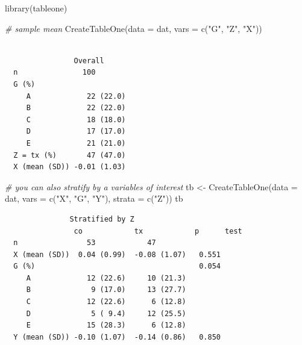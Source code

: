 \documentclass[
  letterpaper,
  DIV=11,
  numbers=noendperiod]{scrreprt}
\newenvironment{Shaded}{}{}
\newcommand{\AttributeTok}[1]{\textcolor[rgb]{0.49,0.56,0.16}{#1}}
\newcommand{\CommentTok}[1]{\textcolor[rgb]{0.38,0.63,0.69}{\textit{#1}}}
\newcommand{\FunctionTok}[1]{\textcolor[rgb]{0.02,0.16,0.49}{#1}}
\newcommand{\NormalTok}[1]{#1}
\newcommand{\OtherTok}[1]{\textcolor[rgb]{0.00,0.44,0.13}{#1}}
\newcommand{\StringTok}[1]{\textcolor[rgb]{0.25,0.44,0.63}{#1}}
\begin{document}
\begin{Shaded}
\begin{Highlighting}[]
\FunctionTok{library}\NormalTok{(tableone)}

\CommentTok{\# sample mean  }
\FunctionTok{CreateTableOne}\NormalTok{(}\AttributeTok{data =}\NormalTok{ dat,}
               \AttributeTok{vars =} \FunctionTok{c}\NormalTok{(}\StringTok{"G"}\NormalTok{, }\StringTok{"Z"}\NormalTok{, }\StringTok{"X"}\NormalTok{))}
\end{Highlighting}
\end{Shaded}

\begin{verbatim}
               
                Overall      
  n               100        
  G (%)                      
     A             22 (22.0) 
     B             22 (22.0) 
     C             18 (18.0) 
     D             17 (17.0) 
     E             21 (21.0) 
  Z = tx (%)       47 (47.0) 
  X (mean (SD)) -0.01 (1.03) 
\end{verbatim}

\begin{Shaded}
\begin{Highlighting}[]
\CommentTok{\# you can also stratify by a variables of interest}
\NormalTok{tb }\OtherTok{\textless{}{-}} \FunctionTok{CreateTableOne}\NormalTok{(}\AttributeTok{data =}\NormalTok{ dat,}
                     \AttributeTok{vars =} \FunctionTok{c}\NormalTok{(}\StringTok{"X"}\NormalTok{, }\StringTok{"G"}\NormalTok{, }\StringTok{"Y"}\NormalTok{), }
                     \AttributeTok{strata =} \FunctionTok{c}\NormalTok{(}\StringTok{"Z"}\NormalTok{))}
\NormalTok{tb}
\end{Highlighting}
\end{Shaded}

\begin{verbatim}
               Stratified by Z
                co            tx            p      test
  n                53            47                    
  X (mean (SD))  0.04 (0.99)  -0.08 (1.07)   0.551     
  G (%)                                      0.054     
     A             12 (22.6)     10 (21.3)             
     B              9 (17.0)     13 (27.7)             
     C             12 (22.6)      6 (12.8)             
     D              5 ( 9.4)     12 (25.5)             
     E             15 (28.3)      6 (12.8)             
  Y (mean (SD)) -0.10 (1.07)  -0.14 (0.86)   0.850     
\end{verbatim}
\end{document}
